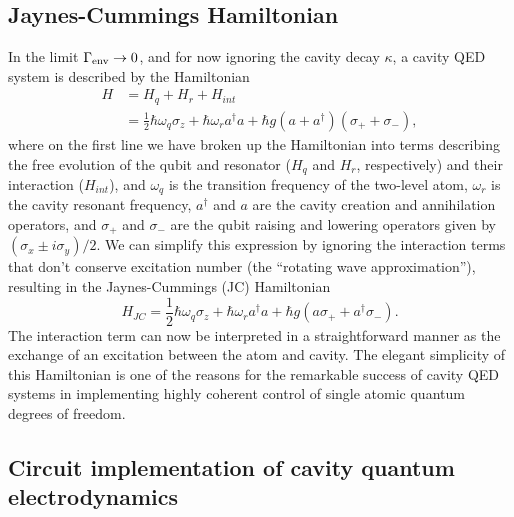 \subsection{Jaynes-Cummings Hamiltonian}

In the limit $\Gamma_{\rm env} \rightarrow 0$, and for now ignoring the cavity decay $\kappa$, a cavity QED system is described by the Hamiltonian \cite{wallbook}
\begin{align}
\label{eq:JC_H_terms} H & = H_q + H_r + H_{int} \\
& = \frac{1}{2}\hbar\omega_q\sigma_z + \hbar \omega_r a^{\dagger} a + \hbar g (a +a^{\dagger})(\sigma_+ + \sigma_-), 
\end{align}
where on the first line we have broken up the Hamiltonian into terms describing the free evolution of the qubit and resonator ($H_q$ and $H_r$, respectively) and their interaction ($H_{int}$), and $\omega_q$ is the transition frequency of the two-level atom, $\omega_r$ is the cavity resonant frequency, $a^{\dagger}$ and $a$ are the cavity creation and annihilation operators, and $\sigma_+$ and $\sigma_-$ are the qubit raising and lowering operators given by $(\sigma_x \pm i \sigma_y)/2$.  We can simplify this expression by ignoring the interaction terms that don't conserve excitation number (the ``rotating wave approximation''), resulting in the Jaynes-Cummings (JC) Hamiltonian
\begin{equation}
H_{JC} = \frac{1}{2}\hbar\omega_q\sigma_z + \hbar \omega_r a^\dagger a + \hbar g (a \sigma_+ +a^\dagger \sigma_-).
\label{eq:JC_H}
\end{equation}
The interaction term can now be interpreted in a straightforward manner as the exchange of an excitation between the atom and cavity.  The elegant simplicity of this Hamiltonian is one of the reasons for the remarkable success of cavity QED systems in implementing highly coherent control of single atomic quantum degrees of freedom.

\subsection{Circuit implementation of cavity quantum electrodynamics}

